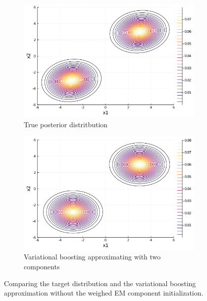 \begin{figure}[H]
\centering
\begin{subfigure}{0.45\textwidth}
\includegraphics[width=1\linewidth]{../../plot/true_post_close.png}
\caption{True posterior distritbution}
\end{subfigure}
\begin{subfigure}{0.45\textwidth}
\includegraphics[width=1\linewidth]{../../plot/approx_post_close.png}
\caption{Variational boosting approximating with two components}
\end{subfigure}
\caption{Comparing the target distribution and the variational boosting approximation without the weighed EM component initialization.}
\end{figure}
